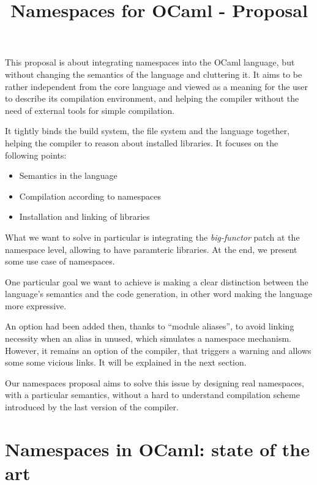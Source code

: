 \documentclass[11pt,a4paper]{article}
\title{Namespaces for OCaml - Proposal}
\begin{document}
\maketitle

This proposal is about integrating namespaces into the OCaml language, but
without changing the semantics of the language and cluttering it. It aims to be
rather independent from the core language and viewed as a meaning for the user to
describe its compilation environment, and helping the compiler without the need
of external tools for simple compilation.

It tightly binds the build system, the file system and the language together,
helping the compiler to reason about installed libraries.
It focuses on the following points:
\begin{itemize}
\item Semantics in the language
\item Compilation according to namespaces
\item Installation and linking of libraries
\end{itemize}

What we want to solve in particular is integrating the \emph{big-functor} patch
at the namespace level, allowing to have paramteric libraries. At the end, we
present some use case of namespaces.

One particular goal we want to achieve is making a clear distinction between the
language's semantics and the code generation, in other word making the language
more expressive. %

An option had been added then, thanks to ``module aliases'', to avoid linking
necessity when an alias in unused, which simulates a namespace
mechanism. However, it remains an option of the compiler, that triggers a
warning and allows some some vicious links. It will be explained in the next
section.

Our namespaces proposal aims to solve this issue by designing real namespaces,
with a particular semantics, without a hard to understand compilation scheme
introduced by the last version of the compiler.

\section{Namespaces in OCaml: state of the art}
\end{document}
